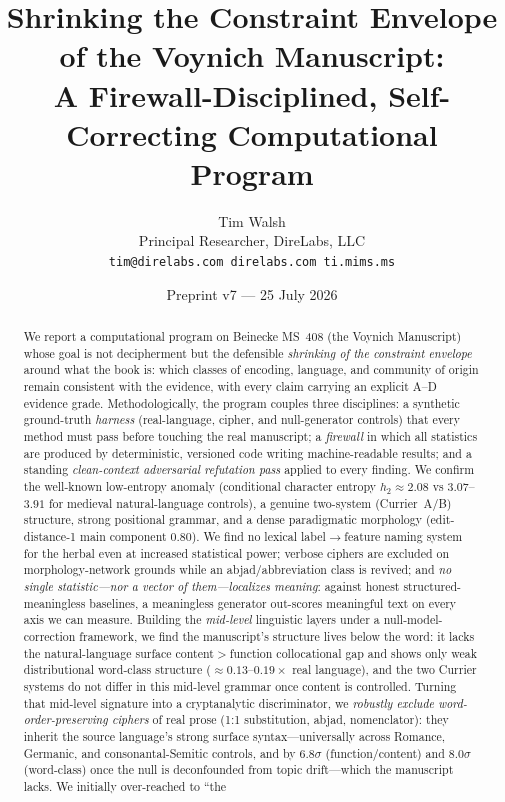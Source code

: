 \documentclass[11pt]{article}
\title{\textbf{Shrinking the Constraint Envelope of the Voynich Manuscript:\\
A Firewall-Disciplined, Self-Correcting Computational Program}}
\author{Tim Walsh \\ \small Principal Researcher, DireLabs, LLC \\
\small \texttt{tim@direlabs.com \quad direlabs.com \quad ti.mims.ms}}
\date{Preprint v7 --- 25 July 2026}
\begin{document}
\maketitle

\begin{abstract}
\noindent We report a computational program on Beinecke MS~408 (the Voynich
Manuscript) whose goal is not decipherment but the defensible \emph{shrinking of the
constraint envelope} around what the book is: which classes of encoding, language,
and community of origin remain consistent with the evidence, with every claim carrying
an explicit A--D evidence grade. Methodologically, the program couples three
disciplines: a synthetic ground-truth \emph{harness} (real-language, cipher, and
null-generator controls) that every method must pass before touching the real
manuscript; a \emph{firewall} in which all statistics are produced by deterministic,
versioned code writing machine-readable results; and a standing \emph{clean-context
adversarial refutation pass} applied to every finding. We confirm the well-known
low-entropy anomaly (conditional character entropy $h_2\approx 2.08$ vs
$3.07$--$3.91$ for medieval natural-language controls), a genuine two-system
(Currier~A/B) structure, strong positional grammar, and a dense paradigmatic
morphology (edit-distance-1 main component $0.80$). We find no lexical
label$\rightarrow$feature naming system for the herbal even at increased statistical
power; verbose ciphers are excluded on morphology-network grounds while an
abjad/abbreviation class is revived; and \emph{no single statistic---nor a vector of
them---localizes meaning}: against honest structured-meaningless baselines, a
meaningless generator out-scores meaningful text on every axis we can measure. Building
the \emph{mid-level} linguistic layers under a null-model-correction framework, we find
the manuscript's structure lives below the word: it lacks the natural-language surface
content$>$function collocational gap and shows only weak distributional word-class
structure ($\approx\!0.13$--$0.19\times$ real language), and the two Currier systems do
not differ in this mid-level grammar once content is controlled. Turning that mid-level
signature into a cryptanalytic discriminator, we \emph{robustly exclude
word-order-preserving ciphers} of real prose (1:1 substitution, abjad, nomenclator): they
inherit the source language's strong surface syntax---universally across Romance, Germanic,
and consonantal-Semitic controls, and by $6.8\sigma$ (function/content) and $8.0\sigma$
(word-class) once the null is deconfounded from topic drift---which the manuscript lacks. We initially over-reached to ``the

\end{abstract}
\end{document}
